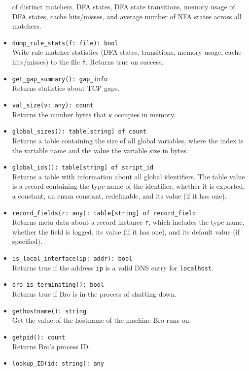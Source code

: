 \documentclass[10pt,landscape]{article}
\newcommand{\ReturnsTrueOnSuccess}{Returns true on success.\xspace}
\begin{document}
\begin{multicols*}{2}
\begin{itemize}
    of distinct matchers, DFA states, DFA state transitions, memory usage of
    DFA states, cache hits/misses, and average number of NFA states across all
    matchers.
  \item \verb|dump_rule_stats(f: file): bool|\\
    Write rule matcher statistics (DFA states, transitions, memory usage, cache
    hits/misses) to the file \verb|f|.
    \ReturnsTrueOnSuccess
  \item \verb|get_gap_summary(): gap_info|\\
    Returns statistics about TCP gaps.
  \item \verb|val_size(v: any): count|\\
    Returns the number bytes that \verb|v| occupies in memory.
  \item \verb|global_sizes(): table[string] of count|\\
    Returns a table containing the size of all global variables, where the
    index is the variable name and the value the variable size in bytes.
  \item \verb|global_ids(): table[string] of script_id|\\
    Returns a table with information about all global identifiers. The table
    value is a record containing the type name of the identifier, whether it is
    exported, a constant, an enum constant, redefinable, and its value (if it
    has one).
  \item \verb|record_fields(r: any): table[string] of record_field|\\
    Returns meta data about a record instance \verb|r|, which includes the
    type name, whether the field is logged, its value (if it has one), and its
    default value (if specified).
  \item \verb|is_local_interface(ip: addr): bool|\\
    Returns true if the address \verb|ip| is a valid DNS entry for
    \texttt{localhost}.
  \item \verb|bro_is_terminating(): bool|\\
    Returns true if Bro is in the process of shutting down.
  \item \verb|gethostname(): string|\\
    Get the value of the hostname of the machine Bro runs on.
  \item \verb|getpid(): count|\\
    Returns Bro's process ID.
  \item \verb|lookup_ID(id: string): any|\\

\end{itemize}
\end{multicols*}
\end{document}
